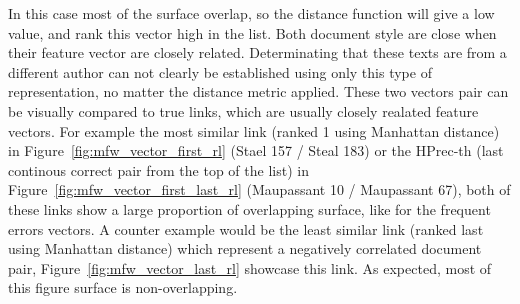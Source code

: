 In this case most of the surface overlap, so the distance function will give a low value, and rank this vector high in the list.
Both document style are close when their feature vector are closely related.
Determinating that these texts are from a different author can not clearly be established using only this type of representation, no matter the distance metric applied.
These two vectors pair can be visually compared to true links, which are usually closely realated feature vectors.
For example the most similar link (ranked 1 using Manhattan distance) in Figure~\ref{fig:mfw_vector_first_rl} (Stael 157 / Steal 183) or the HPrec-th (last continous correct pair from the top of the list) in Figure~\ref{fig:mfw_vector_first_last_rl} (Maupassant 10 / Maupassant 67), both of these links show a large proportion of overlapping surface, like for the frequent errors vectors.
A counter example would be the least similar link (ranked last using Manhattan distance) which represent a negatively correlated document pair, Figure~\ref{fig:mfw_vector_last_rl} showcase this link.
As expected, most of this figure surface is non-overlapping.

